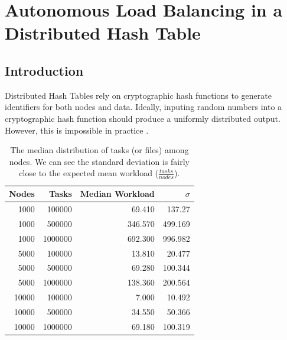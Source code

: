 \chapter{Autonomous Load Balancing in a Distributed Hash Table}
\label{chapter:auto-balance}





\section{Introduction}
Distributed Hash Tables rely on cryptographic hash functions to generate identifiers for both nodes and data.
Ideally, inputing random numbers into a cryptographic hash function should produce a uniformly distributed output.
However, this is impossible in practice \cite{hash-outputs} \cite{thomsen2005cryptographic}.


\begin{table}
	\centering
	\caption{The median distribution of tasks (or files) among nodes.  We can see the standard deviation is fairly close to the expected mean workload ($\frac{tasks}{nodes}$).}
	\begin{tabular}{r r r r}
		Nodes & Tasks & Median Workload & $\sigma$ \\ \hline
		1000 & 100000 & 69.410   &  137.27  \\
		1000 & 500000 & 346.570  &  499.169 \\
		1000 &1000000 & 692.300  &  996.982 \\
		
		5000 & 100000  & 13.810 & 20.477 \\ 
		5000 & 500000  & 69.280 & 100.344 \\ 
		5000 & 1000000 &138.360 & 200.564 \\ 
		
		10000 & 100000 & 7.000   &  10.492 \\
		10000 & 500000 & 34.550  &   50.366 \\
		10000 & 1000000& 69.180  &  100.319 \\
	\end{tabular}
	\label{tab:medianLoads}
\end{table}




